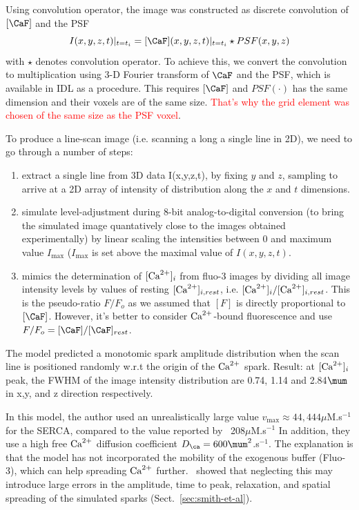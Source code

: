 Using convolution operator, the image was constructed as discrete
convolution of $[\CaF]$ and the PSF
\begin{equation}
  \label{eq:1039}
  I(x,y,z,t)|_{t=t_i} = [\CaF](x,y,z,t)|_{t=t_i} \star PSF(x,y,z)
\end{equation}
with $\star$ denotes convolution operator. To achieve this, we convert
the convolution to multiplication using 3-D Fourier transform of
$\CaF$ and the PSF, which is available in IDL as a procedure. This
requires $[\CaF]$ and $PSF(\cdot)$ has the same dimension and their
voxels are of the same size.
\textcolor{red}{That's why the grid element was chosen of the same
  size as the PSF voxel}.


To produce a line-scan image (i.e. scanning a long a single line in 2D), we need
to go through a number of steps:
\begin{enumerate}
\item extract a single line from 3D data I(x,y,z,t), by fixing $y$ and $z$,
sampling to arrive at a 2D array of intensity of distribution along the $x$ and
$t$ dimensions. 
\item simulate level-adjustment during 8-bit analog-to-digital
  conversion (to bring the simulated image quantatively close to the
  images obtained experimentally) by linear scaling the intensities
  between 0 and maximum value $I_\max$ ($I_\max$ is set above the
  maximal value of $I(x,y,z,t)$. 

\item mimics the determination of $[{\text{Ca}^{2+}}]_i$ from fluo-3 images by
  dividing all image intensity levels by values of resting
  $[{\text{Ca}^{2+}}]_{i,rest}$, i.e. $[{\text{Ca}^{2+}}]_i/[{\text{Ca}^{2+}}]_{i,rest}$. This is the pseudo-ratio
  $F/F_o$ as we assumed that $[F]$ is directly proportional to $[\CaF]$.
  However, it's better to  consider ${\text{Ca}^{2+}}$-bound fluorescence and use
  $F/F_o=[\CaF]/[\CaF]_{rest}$.
  
\end{enumerate}
The model predicted a monotomic spark amplitude distribution when the
scan line is positioned randomly w.r.t the origin of the ${\text{Ca}^{2+}}$
spark. Result: at $[{\text{Ca}^{2+}}]_i$ peak, the FWHM of the image intensity
distribution are 0.74, 1.14 and 2.84$\mum$ in x,y, and z direction
respectively. 

In this model, the author used an unrealistically large value $v_\max\approx
44,444\mu$M.s$^{-1}$ for the SERCA, compared to the value reported
by~\citep{bassani1994rir} 208$\mu$M.s$^{-1}$ In addition, they use a high free
${\text{Ca}^{2+}}$ diffusion coefficient $D_\ca=600\mum^2$.s$^{-1}$. The  explanation is
that the model has not incorporated the mobility of the exogenous buffer
(Fluo-3), which can help spreading ${\text{Ca}^{2+}}$ further.~\citep{smith1998} showed
that neglecting this may introduce large errors in the amplitude, time to peak,
relaxation, and spatial spreading of the simulated sparks
(Sect.~\ref{sec:smith-et-al}).


